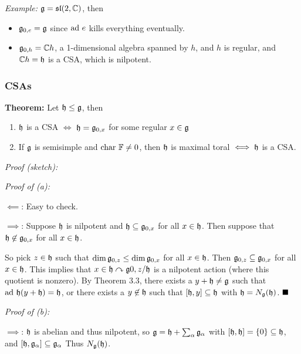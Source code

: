 \emph{Example:} \({\mathfrak{g}} = {\mathfrak{sl}}(2, {\mathbb{C}})\), then

\begin{itemize}
\tightlist
\item
  \({\mathfrak{g}}_{0, e} = {\mathfrak{g}}\) since \(\mathrm{ad}~ e\) kills everything eventually.
\item
  \({\mathfrak{g}}_{0, h} = {\mathbb{C}} h\), a 1-dimensional algebra spanned by \(h\),
  and \(h\) is regular, and \({\mathbb{C}} h = {\mathfrak{h}}\) is a CSA, which is
  nilpotent.
\end{itemize}

\hypertarget{csas}{%
\subsubsection{CSAs}\label{csas}}

\textbf{Theorem:} Let \({\mathfrak{h}} \leq {\mathfrak{g}}\), then

\begin{enumerate}
\def\labelenumi{\alph{enumi}.}
\tightlist
\item
  \({\mathfrak{h}}\) is a CSA \(\iff\) \({\mathfrak{h}} = {\mathfrak{g}}_{0, x}\) for some regular
  \(x\in {\mathfrak{g}}\)
\item
  If \({\mathfrak{g}}\) is semisimple and \(\mathrm{char}~ {\mathbb{F}} \neq 0\), then \({\mathfrak{h}}\) is
  maximal toral \(\iff {\mathfrak{h}}\) is a CSA.
\end{enumerate}

\emph{Proof (sketch):}

\emph{Proof of (a):}

\(\impliedby\): Easy to check.

\(\implies\): Suppose \({\mathfrak{h}}\) is nilpotent and
\({\mathfrak{h}} \subseteq {\mathfrak{g}}_{0, x}\) for all \(x\in{\mathfrak{h}}\). Then suppose
that \({\mathfrak{h}} \not\in {\mathfrak{g}}_{0, x}\) for all \(x\in{\mathfrak{h}}\).

So pick \(z\in {\mathfrak{h}}\) such that
\(\dim {\mathfrak{g}}_{0, z} \leq \dim {\mathfrak{g}}_{0, x}\) for all \(x\in {\mathfrak{h}}\).
Then \({\mathfrak{g}}_{0, z} \subseteq {\mathfrak{g}}_{0, x}\) for all \(x\in {\mathfrak{h}}\).
This implies that \(x\in {\mathfrak{h}} \curvearrowright {\mathfrak{g}}{0, z} / {\mathfrak{h}}\) is a
nilpotent action (where this quotient is nonzero). By Theorem 3.3, there
exists a \(y+{\mathfrak{h}} \neq {\mathfrak{g}}\) such that
\(\mathrm{ad}~ {\mathfrak{h}}(y+{\mathfrak{h}}) = {\mathfrak{h}}\), or there exists a \(y\not\in{\mathfrak{h}}\) such
that \([{\mathfrak{h}}, y] \subseteq {\mathfrak{h}}\) with \({\mathfrak{h}} = N_{\mathfrak{g}}({\mathfrak{h}})\).
\(\qed\)

\emph{Proof of (b):}

\(\implies\): \({\mathfrak{h}}\) is abelian and thus nilpotent, so
\({\mathfrak{g}} = {\mathfrak{h}} + \sum_\alpha {\mathfrak{g}}_\alpha\) with
\([{\mathfrak{h}}, {\mathfrak{h}}] = \left\{{0}\right\} \subseteq {\mathfrak{h}}\), and
\([{\mathfrak{h}}, {\mathfrak{g}}_\alpha] \subseteq {\mathfrak{g}}_\alpha\) Thus
\(N_{\mathfrak{g}}({\mathfrak{h}})\).

